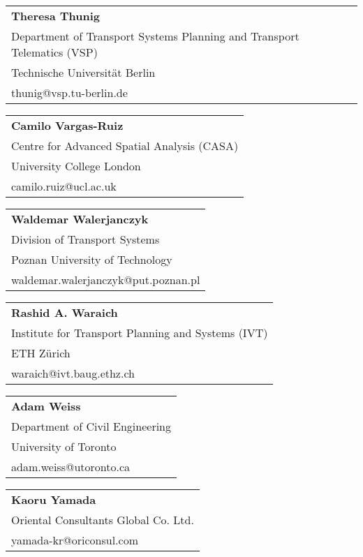 \begin{tabular}[width=0.48\textwidth]{@{}l}
\textbf{Theresa Thunig} \\
Department of Transport Systems Planning and Transport Telematics (VSP) \\
Technische Universität Berlin \\
thunig@vsp.tu-berlin.de \\
\end{tabular}

\begin{tabular}[width=0.48\textwidth]{@{}l}
\textbf{Camilo Vargas-Ruiz} \\
Centre for Advanced Spatial Analysis (CASA) \\
University College London \\
camilo.ruiz@ucl.ac.uk \\
\end{tabular}

\begin{tabular}[width=0.48\textwidth]{@{}l}
\textbf{Waldemar Walerjanczyk} \\
Division of Transport Systems \\
Poznan University of Technology \\
waldemar.walerjanczyk@put.poznan.pl \\
\end{tabular}

\begin{tabular}[width=0.48\textwidth]{@{}l}
\textbf{Rashid A. Waraich} \\
Institute for Transport Planning and Systems (IVT) \\
ETH Zürich \\
waraich@ivt.baug.ethz.ch \\
\end{tabular}

\begin{tabular}[width=0.48\textwidth]{@{}l}
\textbf{Adam Weiss} \\
Department of Civil Engineering \\
University of Toronto \\
adam.weiss@utoronto.ca  \\
\end{tabular}

\begin{tabular}[width=0.48\textwidth]{@{}l}
\textbf{Kaoru Yamada} \\
Oriental Consultants Global Co. Ltd.\\
yamada-kr@oriconsul.com\\
\end{tabular}

